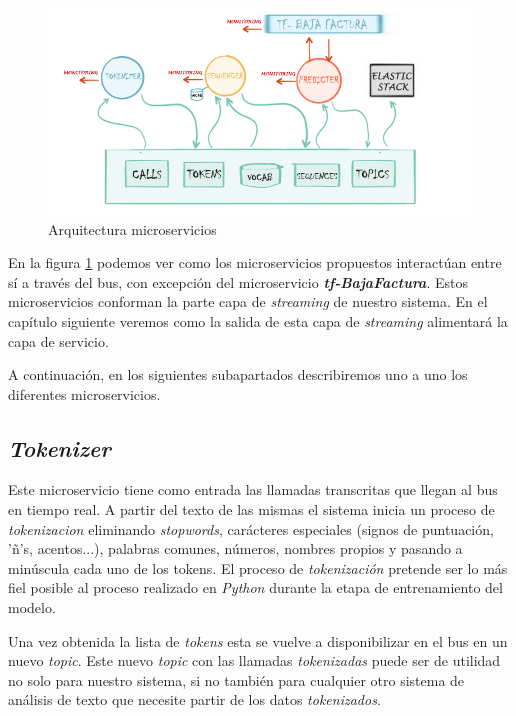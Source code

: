 \begin{figure}[!ht]
	\centering
	\includegraphics[width=1\textwidth]{images/exp/micro-arch-v3}
	\caption{Arquitectura microservicios}
	\label{fig:micro-arch}
\end{figure}


En la figura \ref{fig:micro-arch} podemos ver como los microservicios propuestos interactúan entre sí a través del bus, con excepción del microservicio  \textbf{\textit{tf-BajaFactura}}. Estos microservicios conforman la parte capa de \textit{streaming} de nuestro sistema. En el capítulo siguiente veremos como la salida de esta capa de \textit{streaming} alimentará la capa de servicio.


A continuación, en los siguientes subapartados describiremos uno a uno los diferentes microservicios. 


\subsection{\textit{Tokenizer}}

Este microservicio tiene como entrada las llamadas transcritas que llegan al bus en tiempo real. A partir del texto de las mismas el sistema inicia un proceso de \textit{tokenizacion} eliminando \textit{stopwords}, carácteres especiales (signos de puntuación, 'ñ's, acentos...), palabras comunes, números, nombres propios y pasando a minúscula cada uno de los tokens.  El proceso de \textit{tokenización} pretende ser lo más fiel posible al proceso realizado en \textit{Python} durante la etapa de entrenamiento del modelo.

Una vez obtenida la lista de \textit{tokens} esta se vuelve a disponibilizar en el bus en un nuevo \textit{topic}. Este nuevo \textit{topic} con las llamadas \textit{tokenizadas} puede ser de utilidad no solo para nuestro sistema, si no también para cualquier otro sistema de análisis de texto que necesite partir de los datos \textit{tokenizados}.

